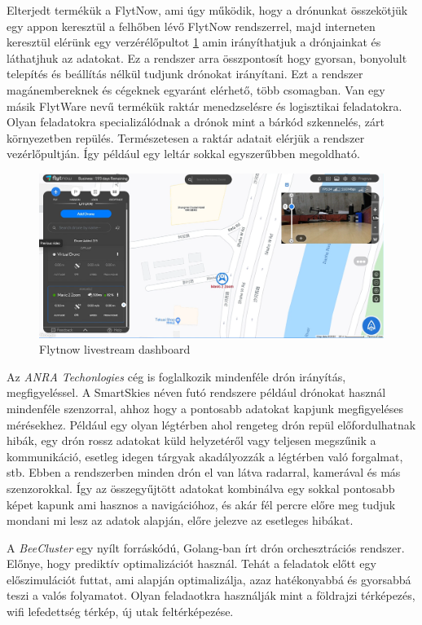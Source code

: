 Elterjedt termékük a FlytNow, ami úgy működik, hogy a drónunkat összekötjük egy appon keresztül a felhőben lévő FlytNow rendszerrel,
majd interneten keresztül elérünk egy verzérélőpultot \ref{fig:flytdash} amin irányíthatjuk a drónjainkat és láthatjhuk az adatokat.
Ez a rendszer arra összpontosít hogy gyorsan, bonyolult telepítés és beállítás nélkül tudjunk drónokat irányítani.
Ezt a rendszer magánembereknek és cégeknek egyaránt elérhető, több csomagban.
Van egy másik FlytWare nevű termékük raktár menedzselésre és logisztikai feladatokra. Olyan feladatokra specializálódnak a drónok mint a bárkód szkennelés,
zárt környezetben repülés. Természetesen a raktár adatait elérjük a rendszer vezérlőpultján. Így például egy leltár sokkal egyszerűbben megoldható.


\begin{figure}[h]
    \centering
    \includegraphics[scale=0.3]{images/flyt-dashboard.png}
    \caption{Flytnow livestream dashboard \cite{flytnow_2021}}
    \label{fig:flytdash}
\end{figure}

Az \textit{ANRA Techonlogies}\cite{anra} cég is foglalkozik mindenféle drón irányítás, megfigyeléssel. A SmartSkies néven futó rendszere például drónokat használ mindenféle szenzorral,
ahhoz hogy a pontosabb adatokat kapjunk megfigyeléses mérésekhez. Például egy olyan légtérben ahol rengeteg drón repül előfordulhatnak hibák, egy drón rossz adatokat küld helyzetéről vagy
teljesen megszűnik a kommunikáció, esetleg idegen tárgyak akadályozzák a légtérben  való forgalmat, stb.
Ebben a rendszerben minden drón el van látva radarral, kamerával és más szenzorokkal. Így az összegyűjtött adatokat kombinálva
egy sokkal pontosabb képet kapunk ami hasznos a navigációhoz, és akár fél percre előre meg tudjuk mondani mi lesz az adatok alapján, előre jelezve az esetleges hibákat.


A \textit{BeeCluster}\cite{beecluster} egy nyílt forráskódú, Golang-ban írt drón orchesztrációs rendszer. Előnye, hogy prediktív optimalizációt használ.
Tehát a feladatok előtt egy előszimulációt futtat, ami alapján optimalizálja, azaz hatékonyabbá és gyorsabbá teszi a valós folyamatot.
Olyan feladaotkra használják mint a földrajzi térképezés, wifi lefedettség térkép, új utak feltérképezése.


